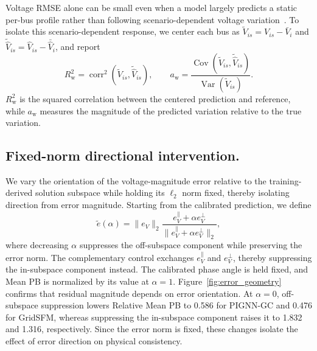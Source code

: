 \documentclass{article}
\begin{document}
Voltage RMSE alone can be small even when a model largely predicts a
static per-bus profile rather than following scenario-dependent voltage
variation~\cite{yang2026gridsfm}. To isolate this scenario-dependent
response, we center each bus as
$\tilde{V}_{is}=V_{is}-\bar{V}_i$ and
$\tilde{\hat{V}}_{is}=\hat{V}_{is}-\bar{\hat{V}}_i$, and report
\begin{equation}
R_{\mathrm{w}}^2
=
\operatorname{corr}^2
\left(\tilde{V}_{is},\tilde{\hat{V}}_{is}\right),
\qquad
a_{\mathrm{w}}
=
\frac{\operatorname{Cov}
\left(\tilde{V}_{is},\tilde{\hat{V}}_{is}\right)}
{\operatorname{Var}\left(\tilde{V}_{is}\right)} .
\end{equation}
$R_{\mathrm{w}}^2$ is the squared correlation between the centered
prediction and reference, while $a_{\mathrm{w}}$ measures the magnitude
of the predicted variation relative to the true variation.


\subsection{Fixed-norm directional intervention.}
We vary the orientation of the voltage-magnitude error relative to the
training-derived solution subspace while holding its $\ell_2$ norm fixed,
thereby isolating direction from error magnitude. Starting from the
calibrated prediction, we define
\begin{equation}
\tilde e(\alpha)
=
\|e_V\|_2
\frac{e_V^\parallel+\alpha e_V^\perp}
{\|e_V^\parallel+\alpha e_V^\perp\|_2},
\label{eq:controlled_geometry}
\end{equation}
where decreasing $\alpha$ suppresses the off-subspace component while
preserving the error norm. The complementary control exchanges
$e_V^\parallel$ and $e_V^\perp$, thereby suppressing the in-subspace
component instead. The calibrated phase angle is held fixed, and Mean PB
is normalized by its value at $\alpha=1$.
Figure~\ref{fig:error_geometry} confirms that residual magnitude depends on error orientation. At $\alpha=0$, off-subspace suppression lowers
Relative Mean PB to 0.586 for PIGNN-GC and 0.476 for GridSFM, whereas
suppressing the in-subspace component raises it to 1.832 and 1.316,
respectively. Since the error norm is fixed, these changes isolate the
effect of error direction on physical consistency.
\end{document}
